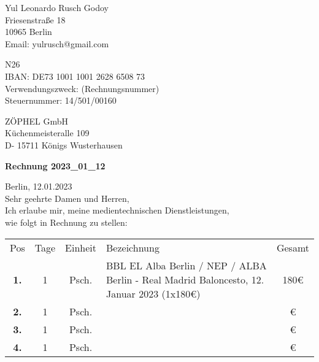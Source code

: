 \documentclass[12pt]{article}
\begin{document}

\begin{flushright}

Yul Leonardo Rusch Godoy\\
Friesenstraße 18\\
10965 Berlin\\
Email: yulrusch@gmail.com\\

\vspace{0.5cm}

N26\\
IBAN: DE73 1001 1001 2628 6508 73\\
Verwendungszweck: (Rechnungsnummer)\\
Steuernummer: 14/501/00160\\

\end{flushright}

\vspace{0.5cm}

\begin{flushleft}

ZÖPHEL GmbH\\
Küchenmeisteralle 109\\
D- 15711 Königs Wusterhausen\\

\vspace{2cm}

\textbf{Rechnung 2023\_01\_12\\}

\vspace{0.5cm}

Berlin, 12.01.2023\\
Sehr geehrte Damen und Herren,\\
Ich erlaube mir, meine medientechnischen Dienstleistungen,\\
wie folgt in Rechnung zu stellen:\\

\end{flushleft}

\begin{flushleft}
\begin{tabular}{c c c p{9.7cm} c}
Pos & Tage & Einheit & Bezeichnung & Gesamt\\ 
\rowcolor{lightgrey}
\textbf{1.} & 1 & Psch. & BBL EL Alba Berlin / NEP / ALBA Berlin - Real Madrid Baloncesto, 12. Januar 2023 (1x180€) & 180€\\ 
\textbf{2.} & 1 & Psch. &  & €\\ 
\rowcolor{lightgrey}
\textbf{3.} & 1 & Psch. &  & €\\ 
\textbf{4.} & 1 & Psch. &  & €\\ 
\end{tabular}        
\end{flushleft}
\end{document}
